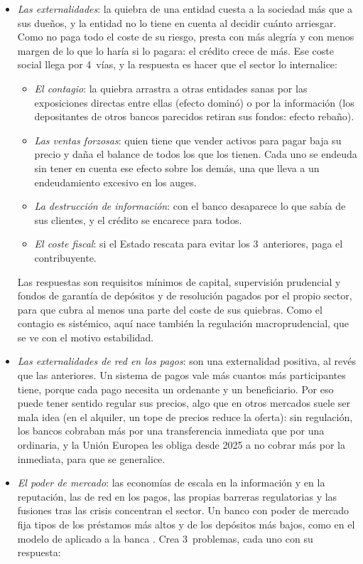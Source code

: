 \documentclass[11pt]{article}
\begin{document}
\begin{itemize}
\begin{itemize}
  \end{itemize}
\item \emph{Las externalidades}: la quiebra de una entidad cuesta a la sociedad más que a sus dueños, y la entidad no lo tiene en cuenta al decidir cuánto arriesgar. Como no paga todo el coste de su riesgo, presta con más alegría y con menos margen de lo que lo haría si lo pagara: el crédito crece de más. Ese coste social llega por 4~vías, y la respuesta es hacer que el sector lo internalice:
  \begin{itemize}
  \item \emph{El contagio}: la quiebra arrastra a otras entidades sanas por las exposiciones directas entre ellas (efecto dominó) o por la información (los depositantes de otros bancos parecidos retiran sus fondos: efecto rebaño).
  \item \emph{Las ventas forzosas}: quien tiene que vender activos para pagar baja su precio y daña el balance de todos los que los tienen. Cada uno se endeuda sin tener en cuenta ese efecto sobre los demás, una  que lleva a un endeudamiento excesivo en los auges\nocite{Korinek2011New}.
  \item \emph{La destrucción de información}: con el banco desaparece lo que sabía de sus clientes, y el crédito se encarece para todos\nocite{Bernanke1983Nonmonetary}.
  \item \emph{El coste fiscal}: si el Estado rescata para evitar los 3~anteriores, paga el contribuyente.
  \end{itemize}
  Las respuestas son requisitos mínimos de capital, supervisión prudencial y fondos de garantía de depósitos y de resolución pagados por el propio sector, para que cubra al menos una parte del coste de sus quiebras. Como el contagio es sistémico, aquí nace también la regulación macroprudencial, que se ve con el motivo estabilidad.
\item \emph{Las externalidades de red en los pagos}: son una externalidad positiva, al revés que las anteriores. Un sistema de pagos vale más cuantos más participantes tiene, porque cada pago necesita un ordenante y un beneficiario. Por eso puede tener sentido regular sus precios, algo que en otros mercados suele ser mala idea (en el alquiler, un tope de precios reduce la oferta): sin regulación, los bancos cobraban más por una transferencia inmediata que por una ordinaria, y la Unión Europea les obliga desde 2025 a no cobrar más por la inmediata, para que se generalice\nocite{UE2024PagosInmediatos}.
\item \emph{El poder de mercado}: las economías de escala en la información y en la reputación, las de red en los pagos, las propias barreras regulatorias y las fusiones tras las crisis concentran el sector. Un banco con poder de mercado fija tipos de los préstamos más altos y de los depósitos más bajos, como en el modelo de  aplicado a la banca \nocite{Klein1971} . Crea 3~problemas, cada uno con su respuesta:

\end{itemize}
\end{document}

